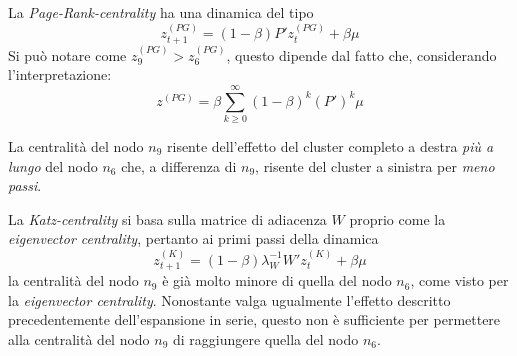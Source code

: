 \begin{alphaparts}
    La \textit{Page-Rank-centrality} ha una dinamica del tipo 
    \[z^{(PG)}_{t+ 1} = (1- \beta)P'z^{(PG)}_{t} + \beta\mu\] 
     Si può notare come \(z^{(PG)}_9>z^{(PG)}_6\), questo dipende dal fatto che, considerando l'interpretazione:
    \[z^{(PG)} = \beta  \sum \limits_{k \geq 0}^{\infty} (1- \beta)^k (P')^k \mu\]

    La centralità del nodo \(n_9\) risente dell'effetto del cluster completo a destra \textit{più a lungo} del nodo \(n_6\) che, a differenza di \(n_9\), risente del cluster a sinistra per \textit{meno passi}.

    
    La \textit{Katz-centrality} si basa sulla matrice di adiacenza \(W\) proprio come la \textit{eigenvector centrality}, pertanto ai primi passi della dinamica
     \[z^{(K)}_{t+ 1} = (1-\beta)\lambda_W^{-1}W' z^{(K)}_t+ \beta \mu\]
     la centralità del nodo \(n_9\) è già molto minore di quella del nodo \(n_6\), come visto per la \textit{eigenvector centrality}. Nonostante valga ugualmente l'effetto descritto precedentemente dell'espansione in serie, questo non è sufficiente per permettere alla centralità del nodo \(n_9\) di raggiungere quella del nodo \(n_6\).
\end{alphaparts}
